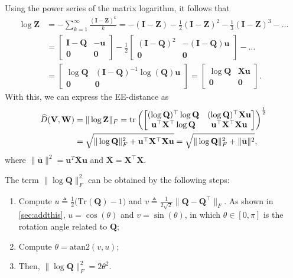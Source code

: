 Using the power series of the matrix logarithm, it follows that
\begin{align*}
    \log\mathbf{Z} &= -\sum_{k=1}^\infty \frac{(\mathbf{I} - \mathbf{Z})^k}{k} = - (\mathbf{I} - \mathbf{Z}) - \frac{1}{2}(\mathbf{I} - \mathbf{Z})^2 - \frac{1}{3} (\mathbf{I} - \mathbf{Z})^3 - \dots\\
    &=\begin{bmatrix}
        \mathbf{I} - \mathbf{Q} & -\mathbf{u}\\\mathbf{0} & \mathbf{0}
    \end{bmatrix} -
    \frac{1}{2}\begin{bmatrix}
        (\mathbf{I} - \mathbf{Q})^2 & -(\mathbf{I} - \mathbf{Q})\mathbf{u}\\\mathbf{0} & \mathbf{0}
    \end{bmatrix} - \dots\\
    &= \begin{bmatrix}
        \log\mathbf{Q} & (\mathbf{I} - \mathbf{Q})^{-1}\log(\mathbf{Q})\mathbf{u}\\\mathbf{0} & \mathbf{0}
    \end{bmatrix} = \begin{bmatrix}
        \log\mathbf{Q} & \mathbf{X}\mathbf{u}\\\mathbf{0} & \mathbf{0}
    \end{bmatrix}.
\end{align*}
With this, we can express the EE-distance as
\begin{align}
    \begin{split}
    \widehat{D}(\mathbf{V}, \mathbf{W}) &= \|\log\mathbf{Z}\|_F = \operatorname{tr}\left(
        \begin{bmatrix}
            (\log\mathbf{Q})^\top\log\mathbf{Q} & (\log\mathbf{Q})^\top\mathbf{X}\mathbf{u}\\
            \mathbf{u}^\top\mathbf{X}^\top\log\mathbf{Q} & \mathbf{u}^\top\mathbf{X}^\top\mathbf{X}\mathbf{u}
        \end{bmatrix}
    \right)^\frac{1}{2}\\
        &= \sqrt{\|\log\mathbf{Q}\|_F^2 + \mathbf{u}^\top\mathbf{X}^\top\mathbf{X}\mathbf{u}} = \sqrt{\|\log\mathbf{Q}\|_F^2 + \|\bar{\mathbf{u}}\|^2},
    \end{split}
\end{align}
where $\|\bar{\mathbf{u}}\|^2 = \mathbf{u}^T\bar{\mathbf{X}}\mathbf{u}$ and $\bar{\mathbf{X}}=\mathbf{X}^\top\mathbf{X}$.

The term $\|\log\mathbf{Q}\|_F^2$ can be obtained by the following steps:
\begin{enumerate}
    \item Compute $u \triangleq \frac{1}{2}\bigl(\text{Tr}(\mathbf{Q})-1\bigr)$ and $v \triangleq \frac{1}{2\sqrt{2}}\|\mathbf{Q}{-}\mathbf{Q}^{\top}\|_F$. As shown in \cref{sec:addthis}, $u = \cos(\theta)$ and $v=\sin(\theta)$, in which $\theta \in [0, \pi]$ is the rotation angle related to $\mathbf{Q}$;
    \item Compute $\theta = \text{atan2}(v,u)$;
    \item Then, $\|\log\mathbf{Q}\|_F^2 = 2\theta^2$.
\end{enumerate}

